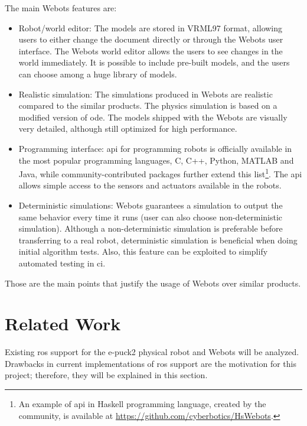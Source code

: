 The main Webots features are:
\begin{itemize}
    \item Robot/world editor: The models are stored in VRML97 format, allowing users to either change the document directly or through the Webots user interface. 
    The Webots world editor allows the users to see changes in the world immediately.
    It is possible to include pre-built models, and the users can choose among a huge library of models.
    \item Realistic simulation: The simulations produced in Webots are realistic compared to the similar products. 
    The physics simulation is based on a modified version of \ac{ode}.
    The models shipped with the Webots are visually very detailed, although still optimized for high performance.
    \item Programming interface: \ac{api} for programming robots is officially available in the most popular programming languages, C, C++, Python, MATLAB and Java, while community-contributed packages further extend this list\footnote{An example of \ac{api} in Haskell programming language, created by the community, is available at \url{https://github.com/cyberbotics/HsWebots}.}.
    The \ac{api} allows simple access to the sensors and actuators available in the robots.
    \item Deterministic simulations: Webots guarantees a simulation to output the same behavior every time it runs (user can also choose non-deterministic simulation).
    Although a non-deterministic simulation is preferable before transferring to a real robot, deterministic simulation is beneficial when doing initial algorithm tests.
    Also, this feature can be exploited to simplify automated testing in \ac{ci}.
\end{itemize}

Those are the main points that justify the usage of Webots over similar products.

\section{Related Work}
Existing \ac{ros} support for the e-puck2 physical robot and Webots will be analyzed.
Drawbacks in current implementations of \ac{ros} support are the motivation for this project; therefore, they will be explained in this section.

